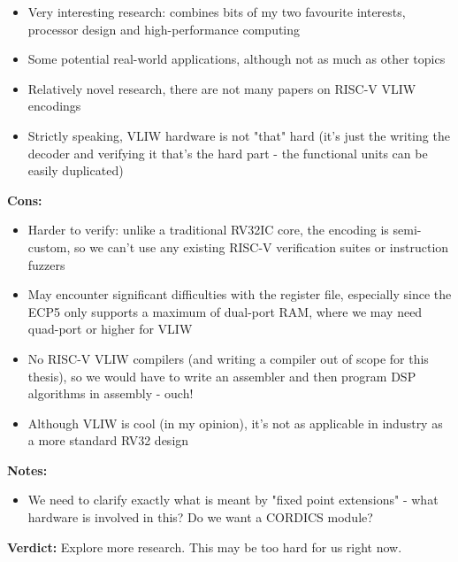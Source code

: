\documentclass[12pt]{article}
\begin{document}
\begin{itemize}
    \item Very interesting research: combines bits of my two favourite interests, processor design and 
	high-performance computing
    \item Some potential real-world applications, although not as much as other topics
    \item Relatively novel research, there are not many papers on RISC-V VLIW encodings
    \item Strictly speaking, VLIW hardware is not "that" hard (it's just the writing the decoder and verifying
	it that's the hard part - the functional units can be easily duplicated)
\end{itemize}

\textbf{Cons:}

\begin{itemize}
    \item Harder to verify: unlike a traditional RV32IC core, the encoding is semi-custom, so we can't use
	any existing RISC-V verification suites or instruction fuzzers
    \item May encounter significant difficulties with the register file, especially since the ECP5 only
	supports a maximum of dual-port RAM, where we may need quad-port or higher for VLIW
    \item No RISC-V VLIW compilers (and writing a compiler out of scope for this thesis), so we would have 
	to write an assembler and then program DSP algorithms in assembly - ouch!
    \item Although VLIW is cool (in my opinion), it's not as applicable in industry as a more standard RV32
	design
\end{itemize}

\textbf{Notes:}

\begin{itemize}
    \item We need to clarify exactly what is meant by "fixed point extensions" - what hardware is involved in
	this? Do we want a CORDICS module?
\end{itemize}

\textbf{Verdict:} Explore more research. This may be too hard for us right now.
\end{document}
